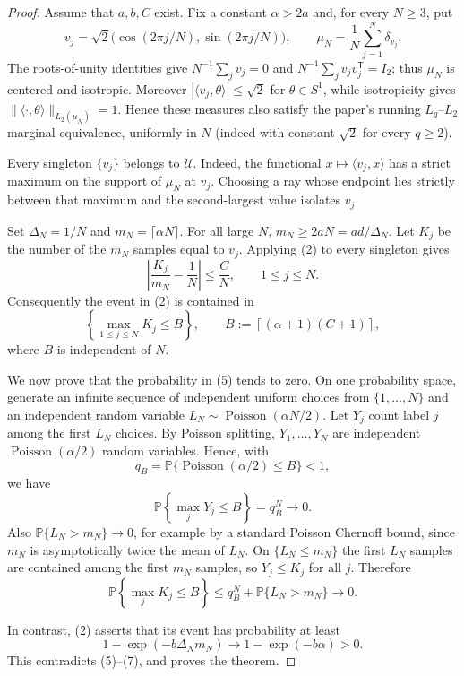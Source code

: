 \documentclass[11pt]{article}
\newcommand{\Prob}{\mathbb P}
\begin{document}
\begin{proof}
Assume that $a,b,C$ exist.  Fix a constant $\alpha>2a$ and, for every
$N\ge3$, put
\[
 v_j=\sqrt2\bigl(\cos(2\pi j/N),\sin(2\pi j/N)\bigr),
 \qquad
 \mu_N=\frac1N\sum_{j=1}^N\delta_{v_j}.
 \tag{3}
\]
The roots-of-unity identities give
$N^{-1}\sum_jv_j=0$ and
$N^{-1}\sum_jv_jv_j^{\mathsf T}=I_2$; thus $\mu_N$ is centered and
isotropic.  Moreover $|\langle v_j,\theta\rangle|\le\sqrt2$ for
$\theta\in S^1$, while isotropicity gives
$\|\langle\cdot,\theta\rangle\|_{L_2(\mu_N)}=1$.  Hence these measures also
satisfy the paper's running $L_q$--$L_2$ marginal equivalence, uniformly in
$N$ (indeed with constant $\sqrt2$ for every $q\ge2$).

Every singleton $\{v_j\}$ belongs to $\mathcal U$.  Indeed, the functional
$x\mapsto\langle v_j,x\rangle$ has a strict maximum on the support of
$\mu_N$ at $v_j$.  Choosing a ray whose endpoint lies strictly between that
maximum and the second-largest value isolates $v_j$.

Set $\Delta_N=1/N$ and $m_N=\lceil\alpha N\rceil$.  For all large $N$,
$m_N\ge 2aN=ad/\Delta_N$.  Let $K_j$ be the number of the $m_N$ samples
equal to $v_j$. Applying (2) to every singleton gives
\[
 \left|\frac{K_j}{m_N}-\frac1N\right|\le\frac CN,
 \qquad 1\le j\le N.
 \tag{4}
\]
Consequently the event in (2) is contained in
\[
 \left\{\max_{1\le j\le N}K_j\le B\right\},
 \qquad B:=\left\lceil(\alpha+1)(C+1)\right\rceil,
 \tag{5}
\]
where $B$ is independent of $N$.

We now prove that the probability in (5) tends to zero.  On one probability
space, generate an infinite sequence of independent uniform choices from
$\{1,\dots,N\}$ and an independent random variable
$L_N\sim\operatorname{Poisson}(\alpha N/2)$.  Let $Y_j$ count label $j$
among the first $L_N$ choices.  By Poisson splitting,
$Y_1,\dots,Y_N$ are independent $\operatorname{Poisson}(\alpha/2)$ random
variables.  Hence, with
\[
 q_B=\Prob\{\operatorname{Poisson}(\alpha/2)\le B\}<1,
\]
we have
\[
 \Prob\left\{\max_jY_j\le B\right\}=q_B^N\longrightarrow0.
 \tag{6}
\]
Also $\Prob\{L_N>m_N\}\to0$, for example by a standard Poisson Chernoff
bound, since $m_N$ is asymptotically twice the mean of $L_N$.
On $\{L_N\le m_N\}$ the first $L_N$ samples are contained among the first
$m_N$ samples, so $Y_j\le K_j$ for all $j$.  Therefore
\[
 \Prob\left\{\max_jK_j\le B\right\}
 \le q_B^N+\Prob\{L_N>m_N\}\longrightarrow0.
 \tag{7}
\]

In contrast, (2) asserts that its event has probability at least
\[
 1-\exp(-b\Delta_Nm_N)\longrightarrow1-\exp(-b\alpha)>0.
\]
This contradicts (5)--(7), and proves the theorem.
\end{proof}
\end{document}
